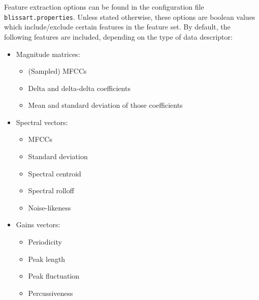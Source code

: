 Feature extraction options can be found in the configuration file {\tt
  blissart.properties}. Unless stated otherwise, these options are boolean
values which include/exclude certain features in the feature set. By default,
the following features are included, depending on the type of data descriptor:
\begin{itemize}
    \item   Magnitude matrices:
        \begin{itemize}
            \item   (Sampled) MFCCs
            \item   Delta and delta-delta coefficients
            \item   Mean and standard deviation of those coefficients
        \end{itemize}
    \item   Spectral vectors:
        \begin{itemize}
            \item   MFCCs
            \item   Standard deviation
            \item   Spectral centroid
            \item   Spectral rolloff
            \item   Noise-likeness
        \end{itemize}
    \item   Gains vectors:
        \begin{itemize}
            \item   Periodicity
            \item   Peak length
            \item   Peak fluctuation
            \item   Percussiveness
        \end{itemize}
\end{itemize}

